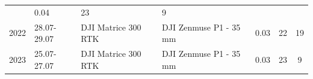 \begin{table}[p]
\begin{tabular}{c  m{1.8cm} m{3.5cm} m{4.2cm} c c c }
                                                                          & 0.04
                                                                          & 23
                                                                          &
        9
        \\[4mm]        
        2022                                                              & 28.07-29.07
                                                                          & DJI Matrice 300 RTK
                                                                          & DJI Zenmuse P1 - 35 mm
                                                                          & 0.03
                                                                          & 22
                                                                          &
        19
        \\[4mm]
        2023                                                              & 25.07-27.07
                                                                          & DJI Matrice 300 RTK
                                                                          & DJI Zenmuse P1 - 35 mm
                                                                          & 0.03
                                                                          & 23
                                                                          &
        9
        \\[4mm]        
        \bottomrule

    \end{tabular}
    \label{tab:3:datasets}
\end{table}

